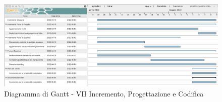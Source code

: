 \begin{figure}[H]
	\centering
	\includegraphics[scale=0.30]{Sezioni/gantt/VII_incremento.png}
	\caption{Diagramma di Gantt - VII Incremento, Progettazione e Codifica}
\end{figure}

\pagebreak

